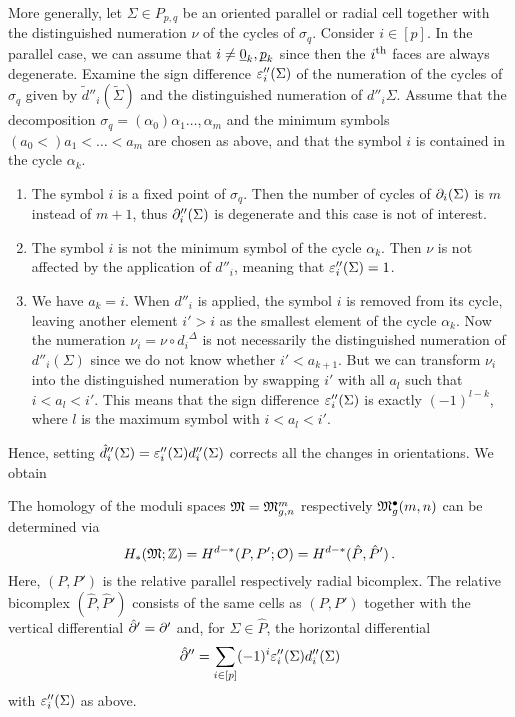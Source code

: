 More generally, let $\Sigma \in P_{p, q}$ be an oriented parallel or radial cell together with the distinguished numeration $\nu$ of the cycles of $\sigma_q$.
Consider $i \in [p]$.
In the parallel case, we can assume that $i \neq \underline{\smash{0}}_k, \underline{\smash{p}}_k$ since then the $i^{\text{th}}$ faces are always degenerate.
Examine the sign difference $\varepsilon_i''(\Sigma)$ of the numeration of the cycles of $\sigma_q$ given by $\tilde d''_i (\tilde \Sigma)$ 
and the distinguished numeration of $d''_i \Sigma$.
Assume that the decomposition $\sigma_q = (\alpha_0) \alpha_1 \dotsc, \alpha_m$ 
and the minimum symbols $(a_0 < ) a_1 < \dotsc < a_m$ are chosen as above,
and that the symbol $i$ is contained in the cycle $\alpha_k$.
\begin{enumerate}
\item
The symbol $i$ is a fixed point of $\sigma_q$. 
Then the number of cycles of $\partial_i(\Sigma)$ is $m$ instead of $m+1$, 
thus $\partial''_i(\Sigma)$ is degenerate and this case is not of interest.
\item 
The symbol $i$ is not the minimum symbol of the cycle $\alpha_k$.
Then $\nu$ is not affected by the application of $d''_i$, meaning that $\varepsilon_i''(\Sigma) = 1$.
\item 
We have $a_k = i$.
When $d''_i$ is applied, the symbol $i$ is removed from its cycle, 
leaving another element $i' > i$ as the smallest element of the cycle $\alpha_k$.
Now the numeration $\nu_i = \nu \circ {d_i}^\Delta$ is not necessarily the distinguished numeration of $d''_i(\Sigma)$
since we do not know whether $i' < a_{k + 1}$.
But we can transform $\nu_i$ into the distinguished numeration 
by swapping $i'$ with all $a_{l}$ such that $i < a_l < i'$.
This means that the sign difference $\varepsilon_i''(\Sigma)$ is exactly $(-1)^{l - k}$,
where $l$ is the maximum symbol with $i < a_l < i'$.
\end{enumerate}

Hence, setting $\hat d_i''(\Sigma) = \varepsilon_i''(\Sigma)d_i''(\Sigma)$ corrects all the changes in orientations.
We obtain

\begin{prop}
   The homology of the moduli spaces $\mathfrak M = \mathfrak{M}^m_{g,n}$ respectively $\mathfrak{M}^\bullet_g(m, n)$ can be determined via 
   \[
      H_\ast( \mathfrak M; \mathbb Z ) = H^{d-\ast}( P, P'; \mathcal O) = H^{d-\ast}( \hat P, \hat P')\,.
   \]
   Here, $(P, P')$ is the relative parallel respectively radial bicomplex.
   The relative bicomplex $(\hat P, \hat P')$ consists of the same cells as $(P, P')$ together with the vertical differential $\hat {\partial}' = \partial'$ 
   and, for $\Sigma \in \hat P$, the horizontal differential
   \[
      \hat {\partial}'' =   \sum_{i \in [p]} (-1)^i \varepsilon_i''(\Sigma) d_i''(\Sigma)
   \]
   with $\varepsilon_i''(\Sigma)$ as above.
\end{prop}

